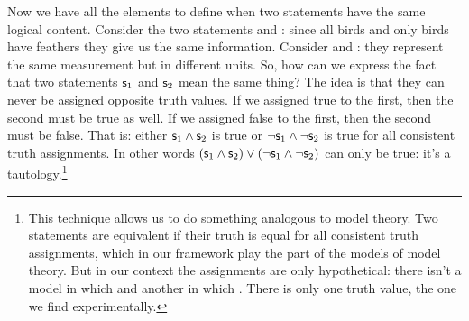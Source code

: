 \documentclass[11pt,letterpaper,fleqn]{memoir} %
\begin{document}
Now we have all the elements to define when two statements have the same logical content. Consider the two statements  and : since all birds and only birds have feathers they give us the same information. Consider  and : they represent the same measurement but in different units. So, how can we express the fact that two statements $\mathsf{s}_1$ and $\mathsf{s}_2$ mean the same thing? The idea is that they can never be assigned opposite truth values. If we assigned true to the first, then the second must be true as well. If we assigned false to the first, then the second must be false. That is: either $\mathsf{s}_1 \wedge \mathsf{s}_2$ is true or $\neg\mathsf{s}_1 \wedge \neg\mathsf{s}_2$ is true for all consistent truth assignments. In other words $(\mathsf{s}_1 \wedge \mathsf{s}_2) \vee (\neg\mathsf{s}_1 \wedge \neg\mathsf{s}_2)$ can only be true: it's a tautology.\footnote{This technique allows us to do something analogous to model theory. Two statements are equivalent if their truth is equal for all consistent truth assignments, which in our framework play the part of the models of model theory. But in our context the assignments are only hypothetical: there isn't a model in which  and another in which . There is only one truth value, the one we find experimentally.}
\end{document}
